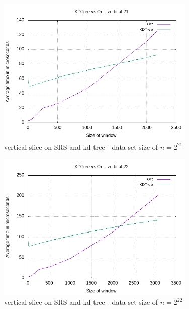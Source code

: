 \begin{figure}[h]
    \centering
    \includegraphics[width = 0.85\textwidth]{pictures/analysis/vert_21.png}
    \caption{vertical slice on SRS and kd-tree - data set size of $n=2^{21}$}\label{fig:vert_21}
\end{figure}

\begin{figure}[h]
    \centering
    \includegraphics[width = 0.85\textwidth]{pictures/analysis/vert_22.png}
    \caption{vertical slice on SRS and kd-tree - data set size of $n=2^{22}$}\label{fig:vert_22}
\end{figure}

